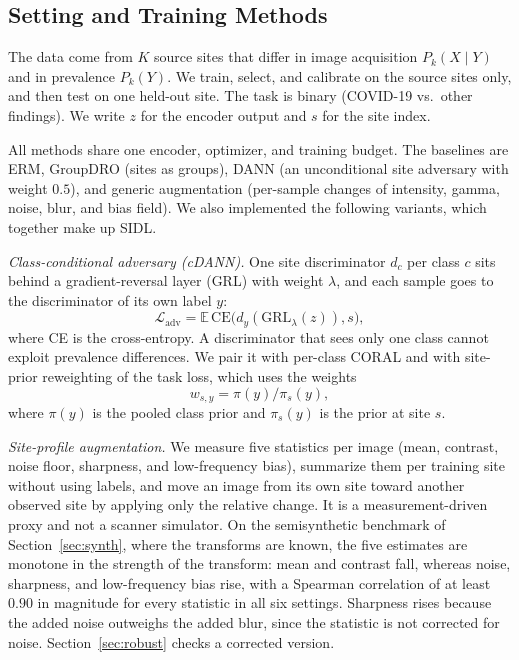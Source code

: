 \documentclass[journal]{IEEEtran}
\newcommand{\erm}{ERM}
\begin{document}
\subsection{Setting and Training Methods}\label{sec:setting}
The data come from $K$ source sites that differ in image acquisition $P_k(X\mid Y)$ and in prevalence $P_k(Y)$. We train, select, and calibrate on the source sites only, and then test on one held-out site. The task is binary (COVID-19 vs.\ other findings). We write $z$ for the encoder output and $s$ for the site index.

All methods share one encoder, optimizer, and training budget. The baselines are \erm{}, GroupDRO (sites as groups), DANN (an unconditional site adversary with weight $0.5$), and generic augmentation (per-sample changes of intensity, gamma, noise, blur, and bias field). We also implemented the following variants, which together make up SIDL.

\emph{Class-conditional adversary (cDANN).} One site discriminator $d_c$ per class $c$ sits behind a gradient-reversal layer (GRL) with weight $\lambda$, and each sample goes to the discriminator of its own label $y$:
\begin{equation}\label{eq:adv}
\mathcal{L}_{\text{adv}}=\mathbb{E}\,\mathrm{CE}\bigl(d_y(\mathrm{GRL}_\lambda(z)),s\bigr),
\end{equation}
where CE is the cross-entropy. A discriminator that sees only one class cannot exploit prevalence differences. We pair it with per-class CORAL and with site-prior reweighting of the task loss, which uses the weights
\begin{equation}\label{eq:prior}
w_{s,y}=\pi(y)/\pi_s(y),
\end{equation}
where $\pi(y)$ is the pooled class prior and $\pi_s(y)$ is the prior at site $s$.

\emph{Site-profile augmentation.} We measure five statistics per image (mean, contrast, noise floor, sharpness, and low-frequency bias), summarize them per training site without using labels, and move an image from its own site toward another observed site by applying only the relative change. It is a measurement-driven proxy and not a scanner simulator. On the semisynthetic benchmark of Section~\ref{sec:synth}, where the transforms are known, the five estimates are monotone in the strength of the transform: mean and contrast fall, whereas noise, sharpness, and low-frequency bias rise, with a Spearman correlation of at least $0.90$ in magnitude for every statistic in all six settings. Sharpness rises because the added noise outweighs the added blur, since the statistic is not corrected for noise. Section~\ref{sec:robust} checks a corrected version.
\end{document}
